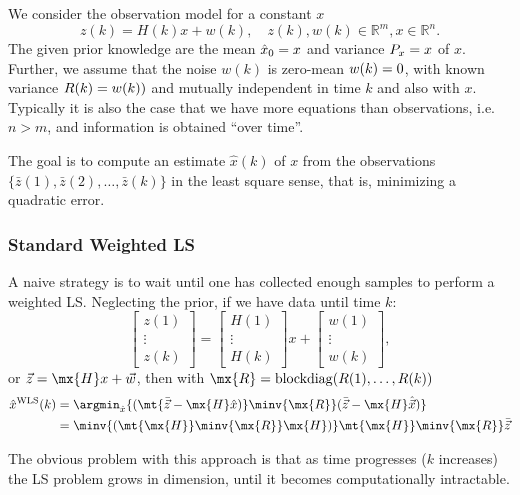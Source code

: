\documentclass[margin=small]{hsrzf}
\makeatletter
\let\ost@expectation\relax \let\ost@variance\relax
\let\E\relax \let\Var\relax
\DeclareMathOperator*{\ost@expectation}{E}
\newcommand*{\E}[2][]{\ost@expectation_{#1}\left\{#2\right\}}
\DeclareMathOperator*{\ost@variance}{Var}
\newcommand*{\Var}[2][]{\ost@variance_{#1}\left\{#2\right\}}
\theoremstyle{plain}
\theoremstyle{definition}
\theoremstyle{remark}
\makeatother
\begin{document}
We consider the observation model for a constant $x$
\[
  z(k) = H(k) x + w(k),
  \quad
  z(k), w(k) \in\mathbb{R}^m, x \in\mathbb{R}^n.
\]
The given prior knowledge are the mean $\hat{x}_0 = \E{x}$ and variance $P_x =
\Var{x}$ of $x$. Further, we assume that the noise $w(k)$ is zero-mean
$\E{w(k)} = 0$, with known variance $R(k) = \Var{w(k))}$ and mutually
independent in time $k$ and also with $x$. Typically it is also the case that
we have more equations than observations, i.e. $n > m$, and information is
obtained ``over time''.

The goal is to compute an estimate $\hat{x}(k)$ of $x$ from the observations
$\{\bar{z}(1), \bar{z}(2), \ldots, \bar{z}(k)\}$ in the least square sense,
that is, minimizing a quadratic error.

\subsubsection{Standard Weighted LS}

A naive strategy is to wait until one has collected enough samples to perform
a weighted LS. Neglecting the prior, if we have data until time $k$:
\[
  \begin{bmatrix} z(1) \\ \vdots \\ z(k) \end{bmatrix} =
  \begin{bmatrix} H(1) \\ \vdots \\ H(k) \end{bmatrix} x +
  \begin{bmatrix} w(1) \\ \vdots \\ w(k) \end{bmatrix},
\]
or $\vec{z} = \mx{H} x + \vec{w}$, then with $\mx{R} =
\operatorname{blockdiag}(R(1), \ldots, R(k))$
\begin{align*}
  \hat{x}^\text{WLS}(k) &= \argmin_{\hat{x}} \{
    (\mt{\bar{\vec{z}} - \mx{H} \hat{x})} \minv{\mx{R}}
      (\bar{\vec{z}} - \mx{H} \hat{\vec{x}})
  \} \\
  &= \minv{(\mt{\mx{H}} \minv{\mx{R}} \mx{H})}
    \mt{\mx{H}} \minv{\mx{R}} \bar{\vec{z}}
\end{align*}

The obvious problem with this approach is that as time progresses ($k$
increases) the LS problem grows in dimension, until it becomes computationally
intractable.
\end{document}
